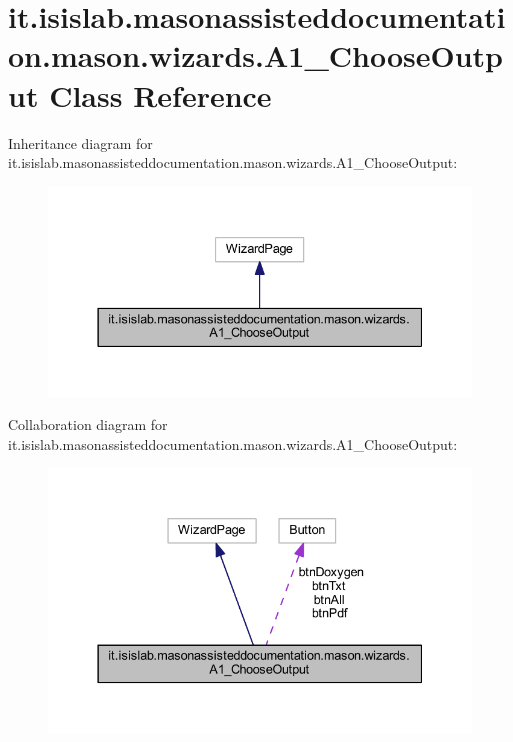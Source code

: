\hypertarget{classit_1_1isislab_1_1masonassisteddocumentation_1_1mason_1_1wizards_1_1_a1___choose_output}{\section{it.\-isislab.\-masonassisteddocumentation.\-mason.\-wizards.\-A1\-\_\-\-Choose\-Output Class Reference}
\label{classit_1_1isislab_1_1masonassisteddocumentation_1_1mason_1_1wizards_1_1_a1___choose_output}
}


Inheritance diagram for it.\-isislab.\-masonassisteddocumentation.\-mason.\-wizards.\-A1\-\_\-\-Choose\-Output\-:\nopagebreak
\begin{figure}[H]
\begin{center}
\leavevmode
\includegraphics[width=337pt]{classit_1_1isislab_1_1masonassisteddocumentation_1_1mason_1_1wizards_1_1_a1___choose_output__inherit__graph}
\end{center}
\end{figure}


Collaboration diagram for it.\-isislab.\-masonassisteddocumentation.\-mason.\-wizards.\-A1\-\_\-\-Choose\-Output\-:\nopagebreak
\begin{figure}[H]
\begin{center}
\leavevmode
\includegraphics[width=337pt]{classit_1_1isislab_1_1masonassisteddocumentation_1_1mason_1_1wizards_1_1_a1___choose_output__coll__graph}
\end{center}
\end{figure}
